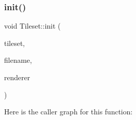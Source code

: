 \subsubsection{\texorpdfstring{init()}{init()}}
{\footnotesize\ttfamily void Tileset\+::init (\begin{DoxyParamCaption}\item[{\mbox{\hyperlink{struct_tileset_1_1_tileset}{Tileset}} $\ast$}]{tileset,  }\item[{const char $\ast$}]{filename,  }\item[{const S\+D\+L\+\_\+\+Renderer $\ast$}]{renderer }\end{DoxyParamCaption})}

Here is the caller graph for this function\+:
